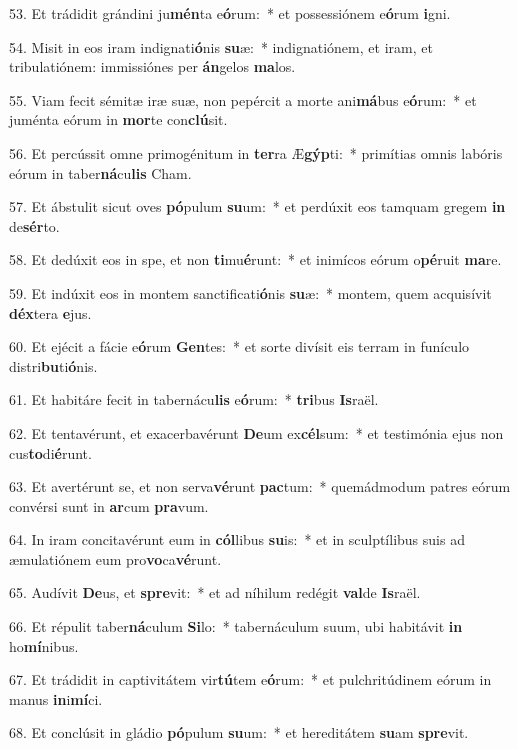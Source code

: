 53. Et trádidit grándini ju\textbf{mén}ta e\textbf{ó}rum:~*  et possessiónem e\textbf{ó}rum \textbf{i}gni.\

54. Misit in eos iram indignati\textbf{ó}nis \textbf{su}æ:~*  indignatiónem, et iram, et tribulatiónem: immissiónes per \textbf{án}gelos \textbf{ma}los.\

55. Viam fecit sémitæ iræ suæ, non pepércit a morte ani\textbf{má}bus e\textbf{ó}rum:~*  et juménta eórum in \textbf{mor}te con\textbf{clú}sit.\

56. Et percússit omne primogénitum in \textbf{ter}ra Æ\textbf{gýp}ti:~*  primítias omnis labóris eórum in taber\textbf{ná}cu\textbf{lis} Cham.\

57. Et ábstulit sicut oves \textbf{pó}pulum \textbf{su}um:~*  et perdúxit eos tamquam gregem \textbf{in} de\textbf{sér}to.\

58. Et dedúxit eos in spe, et non \textbf{ti}mu\textbf{é}runt:~*  et inimícos eórum o\textbf{pé}ruit \textbf{ma}re.\

59. Et indúxit eos in montem sanctificati\textbf{ó}nis \textbf{su}æ:~*  montem, quem acquisívit \textbf{déx}tera \textbf{e}jus.\

60. Et ejécit a fácie e\textbf{ó}rum \textbf{Gen}tes:~*  et sorte divísit eis terram in funículo distri\textbf{bu}ti\textbf{ó}nis.\

61. Et habitáre fecit in tabernácu\textbf{lis} e\textbf{ó}rum:~*  \textbf{tri}bus \textbf{Is}raël.\

62. Et tentavérunt, et exacerbavérunt \textbf{De}um ex\textbf{cél}sum:~*  et testimónia ejus non cus\textbf{to}di\textbf{é}runt.\

63. Et avertérunt se, et non serva\textbf{vé}runt \textbf{pac}tum:~*  quemádmodum patres eórum convérsi sunt in \textbf{ar}cum \textbf{pra}vum.\

64. In iram concitavérunt eum in \textbf{cól}libus \textbf{su}is:~*  et in sculptílibus suis ad æmulatiónem eum pro\textbf{vo}ca\textbf{vé}runt.\

65. Audívit \textbf{De}us, et \textbf{spre}vit:~*  et ad níhilum redégit \textbf{val}de \textbf{Is}raël.\

66. Et répulit taber\textbf{ná}culum \textbf{Si}lo:~*  tabernáculum suum, ubi habitávit \textbf{in} ho\textbf{mí}nibus.\

67. Et trádidit in captivitátem vir\textbf{tú}tem e\textbf{ó}rum:~*  et pulchritúdinem eórum in manus \textbf{in}i\textbf{mí}ci.\

68. Et conclúsit in gládio \textbf{pó}pulum \textbf{su}um:~*  et hereditátem \textbf{su}am \textbf{spre}vit.\

